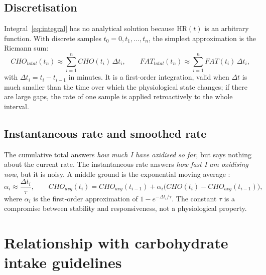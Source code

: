 \documentclass[10pt,a4paper]{article}
\newcommand{\FC}{\ensuremath{\mathrm{HR}}}
\begin{document}
\subsection{Discretisation}
Integral~\eqref{eq:integral} has no analytical solution because $\FC(t)$ is an arbitrary
function. With discrete samples $t_0=0,t_1,\dots,t_n$, the simplest approximation is the
Riemann sum:
\begin{equation}
  CHO_{total}(t_n)\approx\sum_{i=1}^{n}CHO(t_i)\,\Delta t_i, \qquad
  FAT_{total}(t_n)\approx\sum_{i=1}^{n}FAT(t_i)\,\Delta t_i,
\end{equation}
with $\Delta t_i=t_i-t_{i-1}$ in minutes. It is a first-order integration, valid when
$\Delta t$ is much smaller than the time over which the physiological state changes; if
there are large gaps, the rate of one sample is applied retroactively to the whole
interval.

\subsection{Instantaneous rate and smoothed rate}
The cumulative total answers \emph{how much I have oxidised so far}, but says nothing about
the current rate. The instantaneous rate answers \emph{how fast I am oxidising now}, but it
is noisy. A middle ground is the exponential moving average \citep{hunter1986}:
\begin{equation}
  \alpha_i\approx\frac{\Delta t_i}{\tau},\qquad
  CHO_{avg}(t_i)=CHO_{avg}(t_{i-1})+\alpha_i\bigl(CHO(t_i)-CHO_{avg}(t_{i-1})\bigr),
\end{equation}
where $\alpha_i$ is the first-order approximation of $1-e^{-\Delta t_i/\tau}$. The constant
$\tau$ is a compromise between stability and responsiveness, not a physiological property.

\section{Relationship with carbohydrate intake guidelines}\label{sec:fueling}
\end{document}
